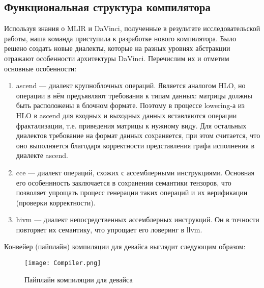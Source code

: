 \subsection{Функциональная структура компилятора}
\label{impl:compiler} %

Используя знания о MLIR и DaVinci, полученные в результате исследовательской
работы, наша команда приступила к разработке нового компилятора. Было решено
создать новые диалекты, которые на разных уровнях абстракции отражают
особенности архитектуры DaVinci. Перечислим их и отметим основные особенности:

\begin{enumerate}
    \item ascend --- диалект крупноблочных операций. Является аналогом HLO, но
          операции в нём предъявляют требования к типам данных: матрицы должны
          быть расположены в блочном формате. Поэтому в процессе lowering-а
          из HLO в ascend для входных и выходных данных вставляются операции
          фрактализации, т.е. приведения матрицы к нужному виду. Для остальных
          диалектов требование на формат данных сохраняется, при этом считается,
          что оно выполняется благодаря корректности представления графа
          исполнения в диалекте ascend.

    \item cce --- диалект операций, схожих с ассемблерными инструкциями.
          Основная его особеннность заключается в сохранении семантики
          тензоров, что позволяет упрощать процесс генерации таких операций и
          их верификации (проверки корректности).

    \item hivm --- диалект непосредственных ассемблерных инструкций. Он в
          точности повторяет их семантику, что упрощает его ловеринг в llvm.
\end{enumerate}

Конвейер (пайплайн) компиляции для девайса выглядит следующим образом:

\begin{figure}[h!]
      \centering
      \texttt{[image: Compiler.png]}
      \caption{Пайплайн компиляции для девайса}
  \end{figure}
